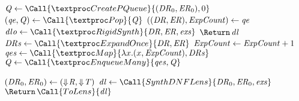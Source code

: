 \documentclass[numbers,10pt,preprint\ifanon ,nocopyrightspace\fi]{sigplanconf}
\begin{document}

\begin{algorithm}
  \caption{\SynthLens}
  \label{alg:synthlens}
  \begin{algorithmic}[1]
    \State $\Queue \gets \Call{\CreatePQueue}{(\DNFRegex_0,\DNFRegexAlt_0),0}$
    \While{$\True$}
    \State $(\QueueElement,\Queue) \gets \Call{\Pop}{\Queue}$
    \State $((\mathit{DR},\mathit{ER}),\mathit{ExpCount}) \gets \mathit{qe}$
    \State $\DNFLensOption \gets
    \Call{\RigidSynth}{\DNFRegex,\DNFRegexAlt,\Examples}$
    \Switch{\DNFLensOption}
    \Case {\SomeOf{\DNFLens}}
    \State $\ReturnVal{\DNFLens}$
    \EndCase
    \SecondCase {\None}
    \State $\DNFRegexs \gets \Call{\ExpandOnce}{\DNFRegex,\DNFRegexAlt}$
    \State $\mathit{ExpCount} \gets \mathit{ExpCount}+1$
    \State $\QueueElements \gets \Call{\Map}{\lambda x.(x,\ExpCount),\DNFRegexs}$
    \State $\Queue \gets \Call{\EnqueueMany}{\QueueElements,\Queue}$
    \EndSecondCase

    \EndSwitch
    \EndWhile
    \EndFunction
    \Statex
    \State $(\mathit{DR}_0,\mathit{ER}_0) \gets
    (\Downarrow\mkern-4mu \mathit{R},\Downarrow\mkern-4mu \mathit{T})$
    \State $\DNFLens \gets \Call{SynthDNFLens}{\DNFRegex_0,\DNFRegexAlt_0,\Examples}$
    \State $\ReturnVal{\Call{ToLens}{\DNFLens}}$
    \EndFunction
  \end{algorithmic}
\end{algorithm}
\end{document}
